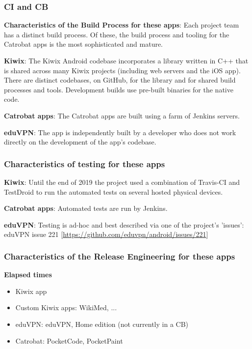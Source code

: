 \documentclass[a4paper]{article}
\begin{document}
\subsubsection{CI and CB}
\textbf{Characteristics of the Build Process for these apps}: Each project team has a distinct build process. Of these, the build process and tooling for the Catrobat apps is the most sophisticated and mature. 

\textbf{Kiwix}: The Kiwix Android codebase incorporates a library written in C++ that is shared across many Kiwix projects (including web servers and the iOS app). There are distinct codebases, on GitHub, for the library and for shared build processes and tools. Development builds use pre-built binaries for the native code. 

\textbf{Catrobat apps}: The Catrobat apps are built using a farm of Jenkins servers. 

\textbf{eduVPN}: The app is independently built by a developer who does not work directly on the development of the app's codebase. 

\subsubsection{Characteristics of testing for these apps}
\textbf{Kiwix}: Until the end of 2019 the project used a combination of Travis-CI and TestDroid to run the automated tests on several hosted physical devices.

\textbf{Catrobat apps}: Automated tests are run by Jenkins. 

\textbf{eduVPN}: Testing is ad-hoc and best described via one of the project's 'issues': eduVPN issue 221 [\href{https://github.com/eduvpn/android/issues/221}{https://github.com/eduvpn/android/issues/221}]


\subsubsection{Characteristics of the Release Engineering for these apps}

\textbf{Elapsed times}

\begin{itemize}
\item Kiwix app
\item Custom Kiwix apps: WikiMed, ...
\item eduVPN: eduVPN, Home edition (not currently in a CB)
\item Catrobat: PocketCode, PocketPaint
\end{itemize}
\end{document}
